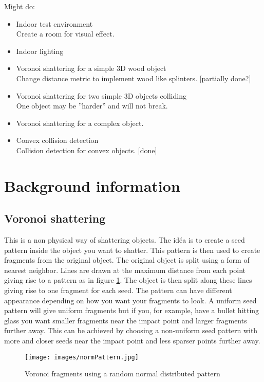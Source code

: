 \documentclass[10pt]{article}
\begin{document}
Might do:
\begin{itemize}

  \item Indoor test environment \hfill \\
  Create a room for visual effect.
  \item Indoor lighting
  \item Voronoi shattering for a simple 3D wood object \hfill \\
  Change distance metric to implement wood like splinters. [partially done?]
  \item Voronoi shattering for two simple 3D objects colliding \hfill \\
  One object may be ”harder” and will not break.
  \item Voronoi shattering for a complex object.
  \item Convex collision detection \hfill \\
  Collision detection for convex objects. [done]

\end{itemize}

\section{Background information}
\subsection{Voronoi shattering}
This is a non physical way of shattering objects. The idéa is to create a
seed pattern inside the object you want to shatter. This pattern is then used
to create fragments from the original object. The original object is split using
a form of nearest neighbor. Lines are drawn at the maximum distance from each
point giving rise to a pattern as in figure \ref{fig:normPattern}. The object
is then split along these lines giving rise to one fragment for each seed.
The pattern can have different appearance depending on how you want your
fragments to look. A uniform seed pattern will give uniform fragments but if
you, for example, have a bullet hitting glass you want smaller fragments near
the impact point and larger fragments further away. This can be achieved by
choosing a non-uniform seed pattern with more and closer seeds near the impact
point and less sparser points further away.

\begin{figure}
    \centering
    \texttt{[image: images/normPattern.jpg]}
    \caption{Voronoi fragments using a random normal distributed pattern}
    \label{fig:normPattern}
\end{figure}
\end{document}
